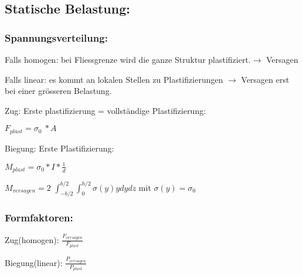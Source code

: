     \subsection{Statische Belastung:}
        \begin{comment}
            \subsubsection{Kraft- \& Deformationsgesteurete Belastung:}
            $\frac{\epsilon_b}{\epsilon_0}$ Deformationsgesteurete Belastung. Bsp vorgespannte Schraube, therm Spannungen. Begrenzung weniger konservativ $\sigma\epsilon$-Diagramm gr Dehnung führt zu nur kl Spannungserhöhung).\\ $\frac{\sigma_B}{\sigma_0}$ Kraftgesteuerte Belastung. (Für viele Metalle $\frac{\epsilon_b}{\epsilon_0} \gg \frac{\sigma_B}{\sigma_0}$) Überschreiten $R_{p0.2}$ weniger Reserve.
        \end{comment}
        \subsubsection{Spannungsverteilung:}
            Falls homogen: bei Fliessgrenze wird die ganze Struktur plastifiziert.$\rightarrow$ Versagen %
              
            Falls linear: es kommt an lokalen Stellen zu Plastifizierungen $\rightarrow$ Versagen erst bei einer grösseren Belastung.
        
      
      Zug:
            Erste plastifizierung = vollständige Plastifizierung:
        
            $F_{plast} = \sigma_0\ * A$
            
      Biegung:
            Erste Plastifizierung:
            
            $M_{plast} = \sigma_0*I*\frac{1}{d}$
            
           $M_{versagen} = 2$ $\int_{-b/2}^{b/2}\int_{0}^{h/2}\sigma(y)ydydz$ mit $\sigma(y) = \sigma_0$
            
            
        \subsubsection{Formfaktoren:}
        
            Zug(homogen): $\frac{F_{versagen}}{F_{plast}}$
            
            Biegung(linear):
            $\frac{P_{versagen}}{P_{plast}}$